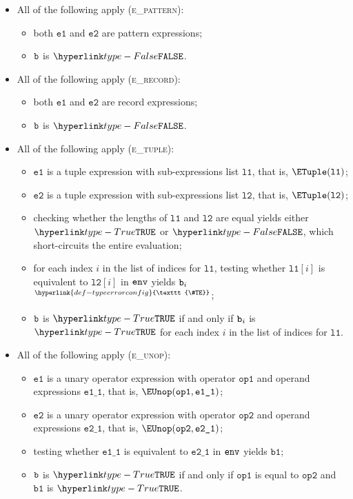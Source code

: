 \documentclass{book}
\newcommand\TypeErrorConfig[0]{\hyperlink{def-typeerrorconfig}{\texttt{\#TE}}}
\newcommand\ProseOrTypeError[0]{\hyperlink{def-proseortypeerror}{$^{\TypeErrorConfig}$}}
\newcommand\veone[0]{\texttt{e1}}
\newcommand\vetwo[0]{\texttt{e2}}
\newcommand\opone[0]{\texttt{op1}}
\newcommand\optwo[0]{\texttt{op2}}
\newcommand\veoneone[0]{\texttt{e1\_1}}
\newcommand\vetwoone[0]{\texttt{e2\_1}}
\newcommand\vbone[0]{\texttt{b1}}
\newcommand\vlone[0]{\texttt{l1}}
\newcommand\vltwo[0]{\texttt{l2}}
\begin{document}
\begin{itemize}
  \item All of the following apply (\textsc{e\_pattern}):
  \begin{itemize}
    \item both $\veone$ and $\vetwo$ are pattern expressions;
    \item $\texttt{b}$ is $\False$.
  \end{itemize}

  \item All of the following apply (\textsc{e\_record}):
  \begin{itemize}
    \item both $\veone$ and $\vetwo$ are record expressions;
    \item $\texttt{b}$ is $\False$.
  \end{itemize}

  \item All of the following apply (\textsc{e\_tuple}):
  \begin{itemize}
    \item $\veone$ is a tuple expression with sub-expressions list $\vlone$,
          that is, $\ETuple(\vlone)$;
    \item $\vetwo$ is a tuple expression with sub-expressions list $\vltwo$,
          that is, $\ETuple(\vltwo)$;
    \item checking whether the lengths of $\vlone$ and $\vltwo$ are equal yields either $\True$ or $\False$, which short-circuits
          the entire evaluation;
    \item for each index $i$ in the list of indices for $\vlone$, testing whether $\vlone[i]$ is equivalent to $\vltwo[i]$
          in $\texttt{env}$ yields $\texttt{b}_i$ \ProseOrTypeError;
    \item $\texttt{b}$ is $\True$ if and only if $\texttt{b}_i$ is $\True$ for each index $i$ in the list of indices for $\vlone$.
  \end{itemize}

  \item All of the following apply (\textsc{e\_unop}):
  \begin{itemize}
    \item $\veone$ is a unary operator expression with operator $\opone$ and operand expressions $\veoneone$,
          that is, $\EUnop(\opone, \veoneone)$;
    \item $\vetwo$ is a unary operator expression with operator $\optwo$ and operand expressions $\vetwoone$,
          that is, $\EUnop(\optwo, \vetwoone)$;
    \item testing whether $\veoneone$ is equivalent to $\vetwoone$ in $\texttt{env}$ yields $\vbone$;
    \item $\texttt{b}$ is $\True$ if and only if $\opone$ is equal to $\optwo$ and $\vbone$ is $\True$.
  \end{itemize}


\end{itemize}
\end{document}
